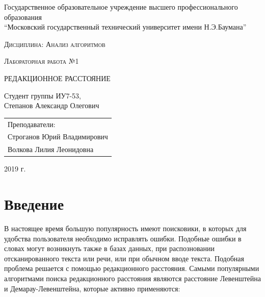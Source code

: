 \documentclass[a4paper,12pt]{article}
\newcommand{\anonsection}[1]{\section*{#1}\addcontentsline{toc}{section}{#1}}
\begin{document}
\begin{titlepage}

    \begin{center}
        \large
        Государственное образовательное учреждение высшего профессионального образования\\
        “Московский государственный технический университет имени Н.Э.Баумана”
        \vspace{3cm}

        \textsc{Дисциплина: Анализ алгоритмов}
        \vspace{0.5cm}

        \textsc{Лабораторная работа №1}
        \vspace{3cm}

        {\LARGE РЕДАКЦИОННОЕ РАССТОЯНИЕ}
        \vspace{3cm}

        Студент группы ИУ7-53,\\
        Степанов Александр Олегович
        \vfill
    \end{center}

    \begin{flushright}
        \begin{tabular}{l}
            Преподаватели:\\
            Строганов Юрий Владимирович\\
            Волкова Лилия Леонидовна
        \end{tabular}
    \end{flushright}

    \begin{center}

        2019 г.

    \end{center}

\end{titlepage}

\tableofcontents

\newpage
\anonsection{Введение}

В настоящее время большую популярность имеют поисковики, в которых для удобства
пользователя необходимо исправлять ошибки. Подобные ошибки в словах могут возникнуть
также в базах данных, при распозновании отсканированного текста или речи, или
при обычном вводе текста. Подобная проблема решается с помощью редакционного
расстояния. \cite{habr}
Самыми популярными алгоритмами поиска редакционного расстояния являются
расстояние Левенштейна и Демарау-Левенштейна, которые активно применяются:
\end{document}

